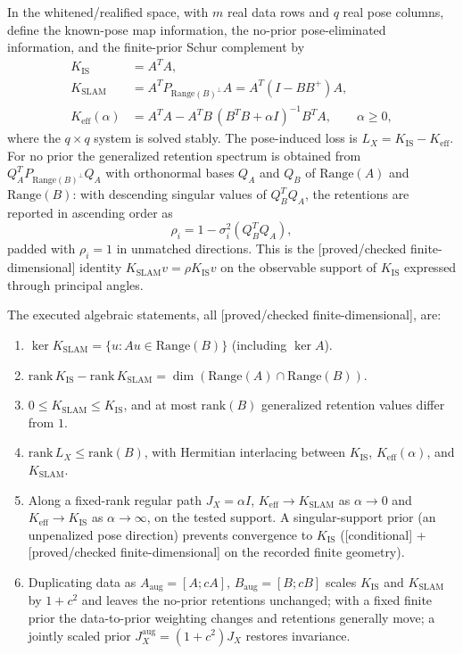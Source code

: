 \documentclass[12pt]{article}
\newcommand{\FDL}{\textnormal{[proved/checked finite-dimensional]}}
\newcommand{\CND}{\textnormal{[conditional]}}
\begin{document}
In the whitened/realified space, with $m$ real data rows and $q$ real pose
columns, define the known-pose map information, the no-prior pose-eliminated
information, and the finite-prior Schur complement by
\begin{align}
K_{\mathrm{IS}}&=A^T A,\\
K_{\mathrm{SLAM}}&=A^T P_{\mathrm{Range}(B)^\perp}A
=A^T(I-BB^+)A,\\
K_{\mathrm{eff}}(\alpha)&=A^TA-A^TB\,(B^TB+\alpha I)^{-1}B^TA,
\qquad \alpha\ge 0,
\end{align}
where the $q\times q$ system is solved stably. The pose-induced loss is
$L_X=K_{\mathrm{IS}}-K_{\mathrm{eff}}$. For no prior the generalized retention
spectrum is obtained from $Q_A^T P_{\mathrm{Range}(B)^\perp}Q_A$ with
orthonormal bases $Q_A$ and $Q_B$ of $\mathrm{Range}(A)$ and
$\mathrm{Range}(B)$: with descending singular values of $Q_B^TQ_A$, the
retentions are reported in ascending order as
\[
\rho_i=1-\sigma_i^2(Q_B^TQ_A),
\]
padded with $\rho_i=1$ in unmatched directions. This is the
\FDL{} identity $K_{\mathrm{SLAM}}v=\rho K_{\mathrm{IS}}v$ on the observable
support of $K_{\mathrm{IS}}$ expressed through principal angles.

The executed algebraic statements, all \FDL{}, are:
\begin{enumerate}
\item $\ker K_{\mathrm{SLAM}}=\{u: Au\in \mathrm{Range}(B)\}$ (including
$\ker A$).
\item $\mathrm{rank}\,K_{\mathrm{IS}}-\mathrm{rank}\,K_{\mathrm{SLAM}}=
\dim(\mathrm{Range}(A)\cap\mathrm{Range}(B))$.
\item $0\le K_{\mathrm{SLAM}}\le K_{\mathrm{IS}}$, and at most
$\mathrm{rank}(B)$ generalized retention values differ from $1$.
\item $\mathrm{rank}\,L_X\le \mathrm{rank}(B)$, with Hermitian interlacing
between $K_{\mathrm{IS}}$, $K_{\mathrm{eff}}(\alpha)$, and $K_{\mathrm{SLAM}}$.
\item Along a fixed-rank regular path $J_X=\alpha I$, $K_{\mathrm{eff}}\to
K_{\mathrm{SLAM}}$ as $\alpha\to0$ and $K_{\mathrm{eff}}\to K_{\mathrm{IS}}$
as $\alpha\to\infty$, on the tested support. A singular-support prior (an
unpenalized pose direction) prevents convergence to $K_{\mathrm{IS}}$
(\CND{} + \FDL{} on the recorded finite geometry).
\item Duplicating data as $A_{\mathrm{aug}}=[A;cA]$,
$B_{\mathrm{aug}}=[B;cB]$ scales $K_{\mathrm{IS}}$ and $K_{\mathrm{SLAM}}$ by
$1+c^2$ and leaves the no-prior retentions unchanged; with a fixed finite
prior the data-to-prior weighting changes and retentions generally move; a
jointly scaled prior $J_X^{\mathrm{aug}}=(1+c^2)J_X$ restores invariance.
\end{enumerate}
\end{document}
